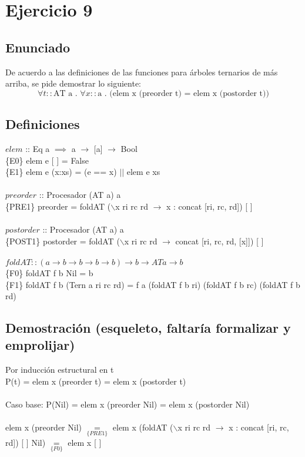 \documentclass[10pt,a4paper]{article}
\begin{document}
\maketitle


\section*{Ejercicio 9}
\subsection*{Enunciado}
De acuerdo a las definiciones de las funciones para árboles ternarios de más arriba, se pide
demostrar lo siguiente: \\
\begin{equation}
	\forall t :: \text{AT a . }\forall x :: \text{a . (elem x (preorder t) = elem x (postorder t))} 
	\label{eq1}
\end{equation}

\subsection*{Definiciones}
\noindent
$elem$ :: Eq a  $\implies$ a $\rightarrow$ [a] $\rightarrow$ Bool \\
\{E0\} elem e [ ] = False \\
\{E1\} elem e (x:xs) = (e == x) $||$ elem e xs \\
\\
$preorder$ :: Procesador (AT a) a \\
\{PRE1\} preorder = foldAT ($\backslash$x ri rc rd $\rightarrow$ x : concat [ri, rc, rd]) [ ]\\
\\
$postorder$ :: Procesador (AT a) a \\
\{POST1\} postorder = foldAT ($\backslash$x ri rc rd $\rightarrow$ concat [ri, rc, rd, [x]]) [ ]\\
\\
$foldAT :: (a \rightarrow b \rightarrow b \rightarrow b \rightarrow b) \rightarrow b \rightarrow AT a \rightarrow b $\\
\{F0\} foldAT f b Nil = b\\
\{F1\} foldAT f b (Tern a ri rc rd) = f a (foldAT f b ri) (foldAT f b rc) (foldAT f b rd) \\

\subsection*{Demostración (esqueleto, faltaría formalizar y emprolijar)}
\noindent
Por inducción estructural en t\\
P(t) = elem x (preorder t) = elem x (postorder t) \\ \\
Caso base: P(Nil) = elem x (preorder Nil) = elem x (postorder Nil)\\ \\
elem x (preorder Nil) $\underset{\{PRE1\}}{=}$ elem x (foldAT ($\backslash$x ri rc rd $\rightarrow$ x : concat [ri, rc, rd]) [ ] Nil) $\underset{\{F0\}}{=}$ elem x [ ] \\
\end{document}

